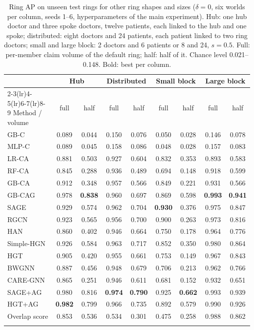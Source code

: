 \begin{table}[h]
\caption{Ring AP on unseen test rings for other ring shapes and sizes ($\delta=0$, six worlds per column, seeds 1--6, hyperparameters of the main experiment). Hub: one hub doctor and three spoke doctors, twelve patients, each linked to the hub and one spoke; distributed: eight doctors and 24 patients, each patient linked to two ring doctors; small and large block: 2 doctors and 6 patients or 8 and 24, $s=0.5$. Full: per-member claim volume of the default ring; half: half of it. Chance level 0.021--0.148. Bold: best per column.}\label{tab:shapes}
\scriptsize
\setlength{\tabcolsep}{3.5pt}
\begin{tabular}{@{}lcccccccc@{}}
\toprule
 & \multicolumn{2}{c}{Hub} & \multicolumn{2}{c}{Distributed} & \multicolumn{2}{c}{Small block} & \multicolumn{2}{c}{Large block} \\
\cmidrule(lr){2-3}\cmidrule(lr){4-5}\cmidrule(lr){6-7}\cmidrule(lr){8-9}
Method / volume & full & half & full & half & full & half & full & half \\
\midrule
GB-C & 0.089 & 0.044 & 0.150 & 0.076 & 0.050 & 0.028 & 0.146 & 0.078 \\
MLP-C & 0.089 & 0.045 & 0.158 & 0.086 & 0.048 & 0.028 & 0.157 & 0.083 \\
LR-CA & 0.881 & 0.503 & 0.927 & 0.604 & 0.832 & 0.353 & 0.893 & 0.583 \\
RF-CA & 0.845 & 0.288 & 0.936 & 0.489 & 0.694 & 0.148 & 0.918 & 0.599 \\
GB-CA & 0.912 & 0.348 & 0.957 & 0.566 & 0.849 & 0.221 & 0.931 & 0.566 \\
GB-CAG & 0.978 & \textbf{0.838} & 0.960 & 0.697 & 0.869 & 0.598 & \textbf{0.993} & \textbf{0.941} \\
\midrule
SAGE & 0.929 & 0.574 & 0.962 & 0.704 & \textbf{0.930} & 0.376 & 0.975 & 0.847 \\
RGCN & 0.923 & 0.565 & 0.956 & 0.700 & 0.900 & 0.263 & 0.973 & 0.816 \\
HAN & 0.860 & 0.402 & 0.946 & 0.664 & 0.750 & 0.178 & 0.964 & 0.776 \\
Simple-HGN & 0.926 & 0.584 & 0.963 & 0.717 & 0.852 & 0.350 & 0.980 & 0.864 \\
HGT & 0.905 & 0.420 & 0.955 & 0.661 & 0.753 & 0.149 & 0.967 & 0.843 \\
\midrule
BWGNN & 0.887 & 0.456 & 0.948 & 0.679 & 0.706 & 0.213 & 0.962 & 0.766 \\
CARE-GNN & 0.865 & 0.251 & 0.946 & 0.611 & 0.681 & 0.152 & 0.932 & 0.651 \\
\midrule
SAGE+AG & 0.980 & 0.816 & \textbf{0.974} & \textbf{0.790} & 0.925 & \textbf{0.662} & 0.993 & 0.939 \\
HGT+AG & \textbf{0.982} & 0.799 & 0.966 & 0.735 & 0.892 & 0.579 & 0.990 & 0.926 \\
Overlap score & 0.853 & 0.536 & 0.534 & 0.301 & 0.475 & 0.258 & 0.988 & 0.862 \\
\botrule
\end{tabular}
\end{table}